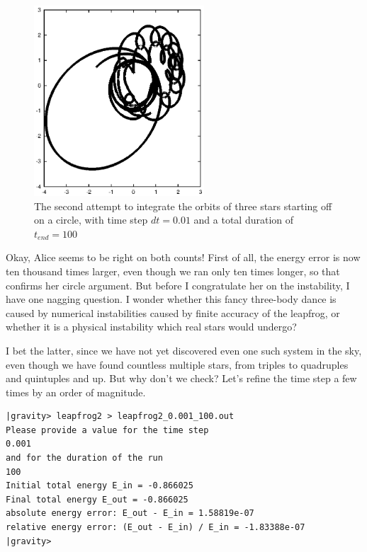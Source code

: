 \begin{figure}[htb]
\centering
\includegraphics[width=2.5in]{chap5/leapfrog2_0.01_100.ps}
\caption[Three stars on a circle, leapfrog, $dt = 0.01$, $t_{end} = 100$]
{The second attempt to integrate the orbits of three stars
starting off on a circle, with time step $dt = 0.01$ and a total
duration of $t_{end} = 100$}
\label{fig:leap2-0.01-100}
\end{figure}

\abc

\bob
Okay, Alice seems to be right on both counts!  First of all, the
energy error is now ten thousand times larger, even though we ran only
ten times longer, so that confirms her circle argument.  But before I
congratulate her on the instability, I have one nagging question.
I wonder whether this fancy three-body dance is caused by numerical
instabilities caused by finite accuracy of the leapfrog, or whether it
is a physical instability which real stars would undergo?

\alice
I bet the latter, since we have not yet discovered even one such
system in the sky, even though we have found countless multiple stars,
from triples to quadruples and quintuples and up.  But why don't we
check?  Let's refine the time step a few times by an order of magnitude.

\cba

\begin{small}
\begin{verbatim}
|gravity> leapfrog2 > leapfrog2_0.001_100.out
Please provide a value for the time step
0.001
and for the duration of the run
100
Initial total energy E_in = -0.866025
Final total energy E_out = -0.866025
absolute energy error: E_out - E_in = 1.58819e-07
relative energy error: (E_out - E_in) / E_in = -1.83388e-07
|gravity>
\end{verbatim}
\end{small}

